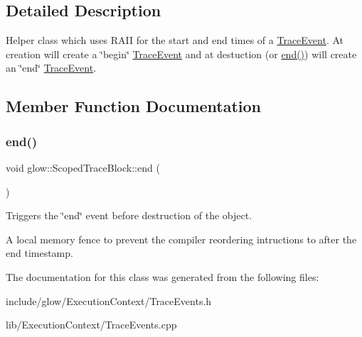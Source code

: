 \subsection{Detailed Description}
Helper class which uses R\+A\+II for the start and end times of a \hyperlink{structglow_1_1_trace_event}{Trace\+Event}. At creation will create a \char`\"{}begin\char`\"{} \hyperlink{structglow_1_1_trace_event}{Trace\+Event} and at destuction (or \hyperlink{classglow_1_1_scoped_trace_block_a8bd958641c7a2118a0e96343514e7b39}{end()}) will create an \char`\"{}end\char`\"{} \hyperlink{structglow_1_1_trace_event}{Trace\+Event}. 

\subsection{Member Function Documentation}
\mbox{\label{classglow_1_1_scoped_trace_block_a8bd958641c7a2118a0e96343514e7b39}} 
\subsubsection{\texorpdfstring{end()}{end()}}
{\footnotesize\ttfamily void glow\+::\+Scoped\+Trace\+Block\+::end (\begin{DoxyParamCaption}{ }\end{DoxyParamCaption})}



Triggers the \char`\"{}end\char`\"{} event before destruction of the object. 

A local memory fence to prevent the compiler reordering intructions to after the end timestamp. 

The documentation for this class was generated from the following files\+:\begin{DoxyCompactItemize}
\item 
include/glow/\+Execution\+Context/Trace\+Events.\+h\item 
lib/\+Execution\+Context/Trace\+Events.\+cpp\end{DoxyCompactItemize}
